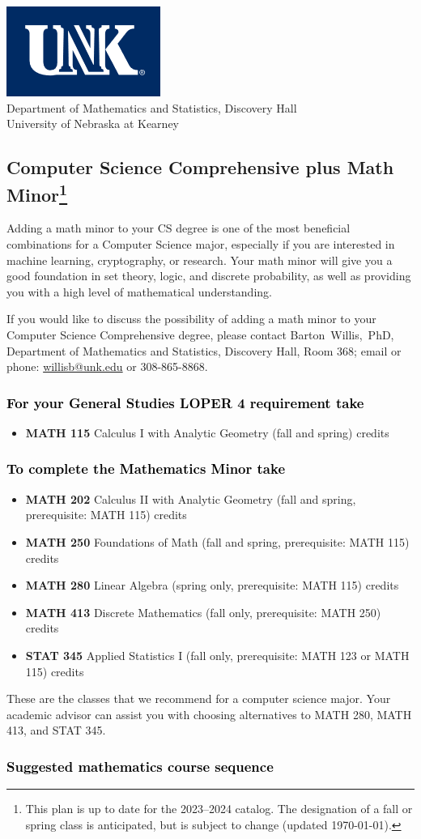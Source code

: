\documentclass[10pt]{article}
\makeatletter
\newcommand{\calcone}{\textbf{MATH 115} Calculus I with Analytic Geometry (fall and spring) \dotfill 5 credits}
\newcommand{\calctwo}{\textbf{MATH 202} Calculus II with Analytic Geometry (fall and spring, prerequisite: MATH 115) \dotfill 5 credits }
\newcommand{\foundations}{\textbf{MATH 250} Foundations of Math (fall and spring, prerequisite: MATH 115)  \dotfill 3 credits}
\newcommand{\linear}{\textbf{MATH 280} Linear Algebra (spring only, prerequisite: MATH 115) \dotfill 3 credits}
\newcommand{\linearshort}{MATH 280}
\newcommand{\discrete}{\textbf{MATH 413} Discrete Mathematics  (fall only, prerequisite: MATH 250)\dotfill 3 credits}
\newcommand{\discreteshort}{MATH 413}
\newcommand{\appliedstat}{\textbf{STAT 345} Applied Statistics I (fall only, prerequisite: MATH 123 or MATH 115) \dotfill 3 credits}
\newcommand{\appliedstatshort}{STAT 345}
\newcommand{\contactbw}{\mbox{Barton Willis, PhD}, Department of Mathematics and Statistics,  Discovery Hall, Room 368;
email or phone: \href{mailto:willisb@unk.edu}{willisb@unk.edu} or 308-865-8868.}
\newcommand{\forinfo}[2]{If you would like to discuss the possibility of adding a math {#1} to your {#2}, please contact \contactbw}
\newcommand{\catalog}{2023--2024 }
\newcommand{\LOPER}{LOPER\xspace}
\newcommand{\myfootnote}{\footnote{This plan is up to date for  the \catalog catalog. The designation of a fall or spring class is 
anticipated, but  is subject to change (updated \today).}}
\newcommand{\myheading}{
\begin{flushleft}
\includegraphics[scale=0.35]{unk-logo}\\
\setcounter{footnote}{0}
\vspace{0.25in}
 \textcolor{unkblue}{Department of Mathematics and Statistics, Discovery Hall} \\
  \textcolor{unkblue}{University of Nebraska at Kearney}
\end{flushleft}}
\makeatother
\begin{document}
\myheading


\subsection*{\textbf{\textcolor{unkblue}{Computer Science Comprehensive plus Math Minor\myfootnote}}}

Adding a math minor to your CS degree is one of the most beneficial 
combinations for a Computer Science major, especially if you are interested 
in machine learning, cryptography, or research. Your math minor will 
give you a good foundation in set theory, logic, and discrete probability, as 
well as providing you with a high level of mathematical understanding.

\forinfo{minor}{Computer Science Comprehensive degree}

\vspace{-0.1in}

\subsubsection*{\textcolor{black}{For your General Studies \LOPER 4 requirement take}}
\begin{itemize}
\item  \calcone
\end{itemize}

\subsubsection*{\textcolor{black}{To complete the Mathematics Minor take}}
\begin{itemize}
\item \calctwo
\item \foundations
\item \linear
\item \discrete
\item \appliedstat
\end{itemize}
\vspace{0.1in}
These are the classes that we recommend for a computer science major.
Your academic advisor can assist you with choosing alternatives 
to \linearshort, \discreteshort, and \appliedstatshort.

\vspace{-0.1in}
\subsubsection*{\textcolor{black}{Suggested mathematics course sequence}}
\end{document}
